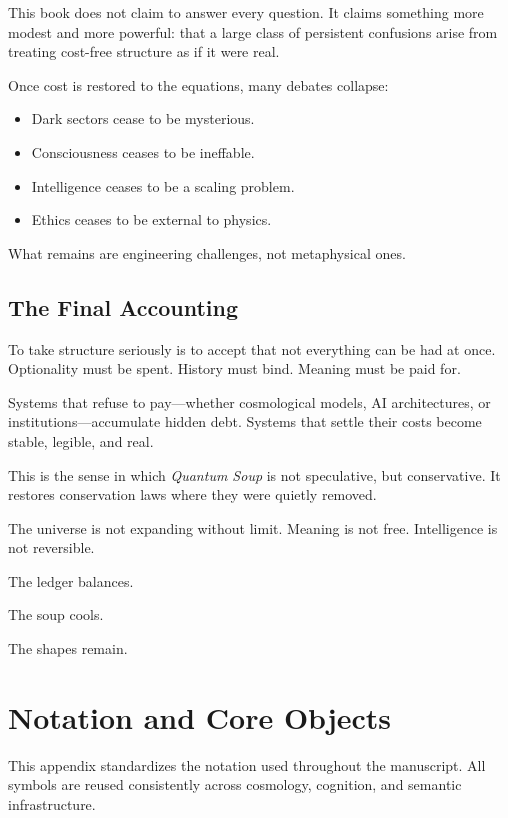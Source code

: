 \documentclass[11pt]{book}
\begin{document}
This book does not claim to answer every question. It claims something more
modest and more powerful: that a large class of persistent confusions arise from
treating cost-free structure as if it were real.

Once cost is restored to the equations, many debates collapse:

\begin{itemize}
\item Dark sectors cease to be mysterious.
\item Consciousness ceases to be ineffable.
\item Intelligence ceases to be a scaling problem.
\item Ethics ceases to be external to physics.
\end{itemize}

What remains are engineering challenges, not metaphysical ones.

\section{The Final Accounting}

To take structure seriously is to accept that not everything can be had at once.
Optionality must be spent. History must bind. Meaning must be paid for.

Systems that refuse to pay—whether cosmological models, AI architectures, or
institutions—accumulate hidden debt. Systems that settle their costs become
stable, legible, and real.

This is the sense in which \emph{Quantum Soup} is not speculative, but
conservative. It restores conservation laws where they were quietly removed.

The universe is not expanding without limit.
Meaning is not free.
Intelligence is not reversible.

The ledger balances.

The soup cools.

The shapes remain.


\appendix
\chapter{Notation and Core Objects}

This appendix standardizes the notation used throughout the manuscript.
All symbols are reused consistently across cosmology, cognition, and
semantic infrastructure.
\end{document}
